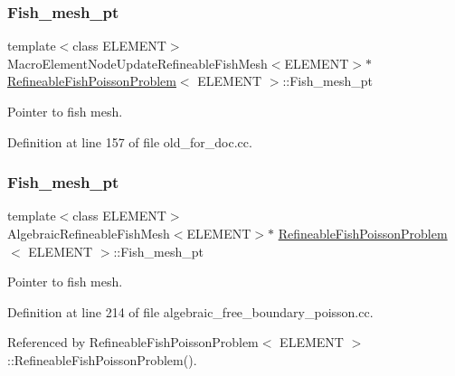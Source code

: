 \subsubsection{\texorpdfstring{Fish\+\_\+mesh\+\_\+pt}{Fish\_mesh\_pt}\hspace{0.1cm}{\footnotesize\ttfamily [1/2]}}
{\footnotesize\ttfamily template$<$class E\+L\+E\+M\+E\+NT$>$ \\
Macro\+Element\+Node\+Update\+Refineable\+Fish\+Mesh$<$E\+L\+E\+M\+E\+NT$>$$\ast$ \hyperlink{classRefineableFishPoissonProblem}{Refineable\+Fish\+Poisson\+Problem}$<$ E\+L\+E\+M\+E\+NT $>$\+::Fish\+\_\+mesh\+\_\+pt\hspace{0.3cm}{\ttfamily [private]}}



Pointer to fish mesh. 



Definition at line 157 of file old\+\_\+for\+\_\+doc.\+cc.

\mbox{\label{classRefineableFishPoissonProblem_af915f09b6e4ae2f4ded2ad1a25ed7f01}} 
\subsubsection{\texorpdfstring{Fish\+\_\+mesh\+\_\+pt}{Fish\_mesh\_pt}\hspace{0.1cm}{\footnotesize\ttfamily [2/2]}}
{\footnotesize\ttfamily template$<$class E\+L\+E\+M\+E\+NT$>$ \\
Algebraic\+Refineable\+Fish\+Mesh$<$E\+L\+E\+M\+E\+NT$>$$\ast$ \hyperlink{classRefineableFishPoissonProblem}{Refineable\+Fish\+Poisson\+Problem}$<$ E\+L\+E\+M\+E\+NT $>$\+::Fish\+\_\+mesh\+\_\+pt\hspace{0.3cm}{\ttfamily [private]}}



Pointer to fish mesh. 



Definition at line 214 of file algebraic\+\_\+free\+\_\+boundary\+\_\+poisson.\+cc.



Referenced by Refineable\+Fish\+Poisson\+Problem$<$ E\+L\+E\+M\+E\+N\+T $>$\+::\+Refineable\+Fish\+Poisson\+Problem().

